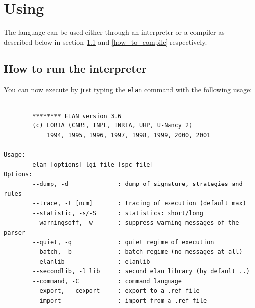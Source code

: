 
\section{Using \elan}

The language can be used either through an interpreter or a compiler
as described below in section~\ref{Run the interpreter}
and \ref{how_to_compile} respectively. 


\subsection{How to run the \elan{} interpreter}
\label{Run the interpreter}
You can now execute \elan{} by just typing the \verb|elan| command with the
following usage: 
{\footnotesize\begin{verbatim}

        ******** ELAN version 3.6
        (c) LORIA (CNRS, INPL, INRIA, UHP, U-Nancy 2)
            1994, 1995, 1996, 1997, 1998, 1999, 2000, 2001

Usage:
        elan [options] lgi_file [spc_file]
Options:
        --dump, -d              : dump of signature, strategies and rules
        --trace, -t [num]       : tracing of execution (default max)
        --statistic, -s/-S      : statistics: short/long
        --warningsoff, -w       : suppress warning messages of the parser
        --quiet, -q             : quiet regime of execution
        --batch, -b             : batch regime (no messages at all)
        --elanlib               : elanlib
        --secondlib, -l lib     : second elan library (by default ..)
        --command, -C           : command language
        --export, --cexport     : export to a .ref file
        --import                : import from a .ref file

\end{verbatim} }

